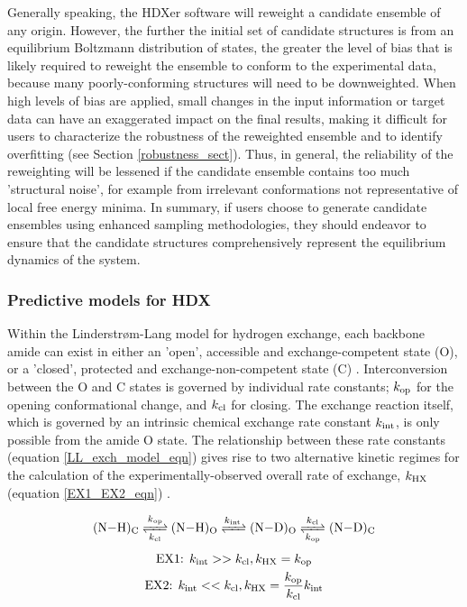 \documentclass[9pt,tutorial]{livecoms}
\begin{document}
Generally speaking, the HDXer software will reweight a candidate ensemble of any origin.
However, the further the initial set of candidate structures is from an equilibrium Boltzmann distribution of states, the greater the level of bias that is likely required to reweight the ensemble to conform to the experimental data, because many poorly-conforming structures will need to be downweighted.
When high levels of bias are applied, small changes in the input information or target data can have an exaggerated impact on the final results, making it difficult for users to characterize the robustness of the reweighted ensemble and to identify overfitting (see Section \ref{robustness_sect}).
Thus, in general, the reliability of the reweighting will be lessened if the candidate ensemble contains too much 'structural noise', for example from irrelevant conformations not representative of local free energy minima.
In summary, if users choose to generate candidate ensembles using enhanced sampling methodologies, they should endeavor to ensure that the candidate structures comprehensively represent the equilibrium dynamics of the system. 

\subsubsection{Predictive models for HDX}\label{predictivemodel_sect}
Within the Linderstrøm-Lang model for hydrogen exchange, each backbone amide can exist in either an 'open', accessible and exchange-competent state (O), or a 'closed', protected and exchange-non-competent state (C) \cite{Hvidt1966, Englander1997, Jensen2016}.
Interconversion between the O and C states is governed by individual rate constants; $k_{\textnormal{op}}$ for the opening conformational change, and $k_{\textnormal{cl}}$ for closing.
The exchange reaction itself, which is governed by an intrinsic chemical exchange rate constant $k_{\textnormal{int}}$, is only possible from the amide O state.
The relationship between these rate constants (equation \ref{LL_exch_model_eqn}) gives rise to two alternative kinetic regimes for the calculation of the experimentally-observed overall rate of exchange, $k_{\textnormal{HX}}$ (equation \ref{EX1_EX2_eqn}) \cite{Jensen2016, Ferraro2004, James2021}.

\begin{equation}\label{LL_exch_model_eqn}
\ce{(N-H)_C <=>[$k$_{op}][$k$_{cl}] (N-H)_O <=>[$k$_{int}][] (N-D)_O <=>[$k$_{cl}][$k$_{op}] (N-D)_C}
\end{equation}
\begin{equation}\label{EX1_EX2_eqn}
\begin{gathered}
\textnormal{EX1:  } k_{\textnormal{int}} >> k_{\textnormal{cl}}  ,  k_{\textnormal{HX}} = k_{\textnormal{op}} \\
\textnormal{EX2:  } k_{\textnormal{int}} << k_{\textnormal{cl}}, k_{\textnormal{HX}} =
\frac{k_{\textnormal{op}}}{k_{\textnormal{cl}}}k_{\textnormal{int}}
\end{gathered}
\end{equation}
\end{document}
